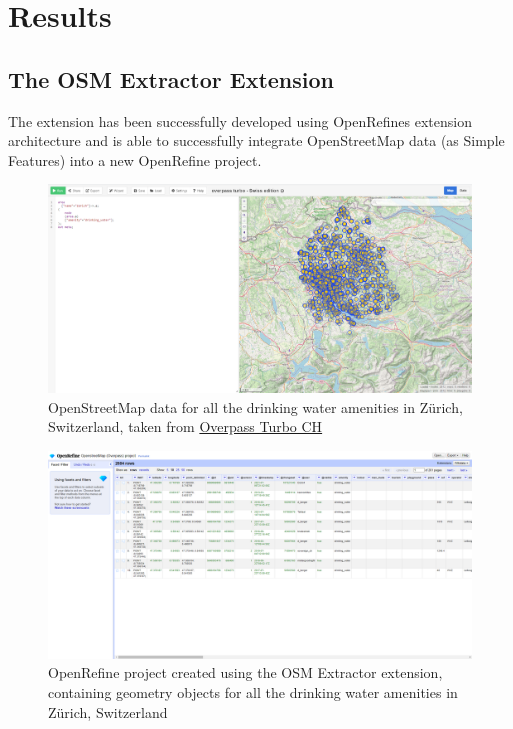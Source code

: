 \section*{Results}
\subsection*{The OSM Extractor Extension}
The extension has been successfully developed using OpenRefine\textquotesingle s extension architecture and is able to successfully
integrate OpenStreetMap data (as Simple Features) into a new OpenRefine project.
\begin{figure}[H]
        \includegraphics[width=\textwidth]{./Figures/ManagementSummary/osm_extractor_overpass_query}
        \caption{OpenStreetMap data for all the drinking water amenities in Zürich, Switzerland, taken from \href{http://overpass-turbo.osm.ch/}{Overpass Turbo CH}}
\end{figure}
\begin{figure}[H]
    \includegraphics[width=\textwidth]{./Figures/ManagementSummary/osm_extractor_project}
    \caption{OpenRefine project created using the OSM Extractor extension, containing geometry objects for all the drinking water amenities in Zürich, Switzerland}
\end{figure}
